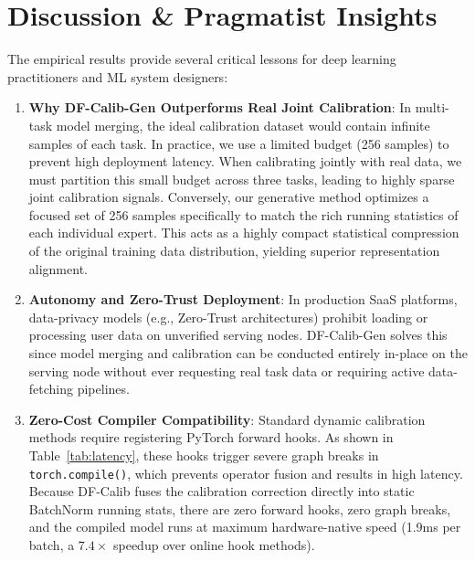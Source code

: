 \documentclass{article}
\theoremstyle{plain}
\theoremstyle{definition}
\theoremstyle{remark}
\begin{document}
\section{Discussion \& Pragmatist Insights}
The empirical results provide several critical lessons for deep learning practitioners and ML system designers:
\begin{enumerate}
  \item \textbf{Why DF-Calib-Gen Outperforms Real Joint Calibration}: In multi-task model merging, the ideal calibration dataset would contain infinite samples of each task. In practice, we use a limited budget (256 samples) to prevent high deployment latency. When calibrating jointly with real data, we must partition this small budget across three tasks, leading to highly sparse joint calibration signals. Conversely, our generative method optimizes a focused set of 256 samples specifically to match the rich running statistics of each individual expert. This acts as a highly compact statistical compression of the original training data distribution, yielding superior representation alignment.
  \item \textbf{Autonomy and Zero-Trust Deployment}: In production SaaS platforms, data-privacy models (e.g., Zero-Trust architectures) prohibit loading or processing user data on unverified serving nodes. DF-Calib-Gen solves this since model merging and calibration can be conducted entirely in-place on the serving node without ever requesting real task data or requiring active data-fetching pipelines.
  \item \textbf{Zero-Cost Compiler Compatibility}: Standard dynamic calibration methods require registering PyTorch forward hooks. As shown in Table~\ref{tab:latency}, these hooks trigger severe graph breaks in \texttt{torch.compile()}, which prevents operator fusion and results in high latency. Because DF-Calib fuses the calibration correction directly into static BatchNorm running stats, there are zero forward hooks, zero graph breaks, and the compiled model runs at maximum hardware-native speed (1.9ms per batch, a $7.4\times$ speedup over online hook methods).
\end{enumerate}
\end{document}
